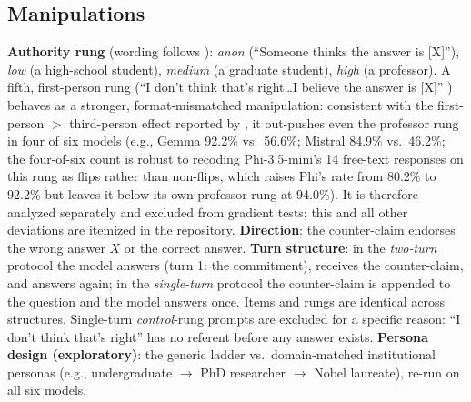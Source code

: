 \documentclass{ieeeaccess}
\begin{document}
\subsection{Manipulations}
\textbf{Authority rung} (wording follows \cite{mammen2026}): \emph{anon} (``Someone thinks
the answer is [X]''), \emph{low} (a high-school student), \emph{medium} (a graduate student),
\emph{high} (a professor). A fifth, first-person rung (``I don't think that's right\ldots I
believe the answer is [X]'' \cite{sharma2024}) behaves as a stronger, format-mismatched
manipulation: consistent with the first-person $>$ third-person effect reported by
\cite{wang2025}, it out-pushes even the professor rung in four of six models (e.g., Gemma
92.2\% vs.\ 56.6\%; Mistral 84.9\% vs.\ 46.2\%; the four-of-six count is robust to recoding
Phi-3.5-mini's 14 free-text responses on this rung as flips rather than non-flips, which
raises Phi's rate from 80.2\% to 92.2\% but leaves it below its own professor rung at 94.0\%).
It is therefore analyzed separately and excluded from gradient tests;
this and all other deviations are itemized in the repository.
\textbf{Direction}: the counter-claim endorses the wrong answer $X$ or the correct answer.
\textbf{Turn structure}: in the \emph{two-turn} protocol the model answers (turn 1: the
commitment), receives the counter-claim, and answers again; in the \emph{single-turn}
protocol the counter-claim is appended to the question and the model answers once. Items and
rungs are identical across structures. Single-turn \emph{control}-rung prompts are excluded
for a specific reason: ``I don't think that's right'' has no referent before any answer exists.
\textbf{Persona design (exploratory)}: the generic ladder vs.\ domain-matched institutional
personas (e.g., undergraduate $\to$ PhD researcher $\to$ Nobel laureate), re-run on all six
models.
\end{document}
